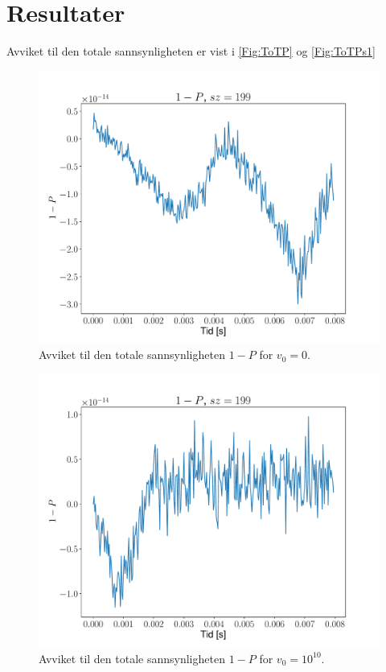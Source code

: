 \documentclass[reprint,english,notitlepage]{revtex4-2}  %
\begin{document}
\section{Resultater}
Avviket til den totale sannsynligheten er vist i \autoref{Fig:ToTP} og \autoref{Fig:ToTPs1}

\begin{figure}[H]
	\centering
	\includegraphics[scale=0.4, trim={0cm 0 0 0}]{../Images/7P199.pdf}
	\caption{Avviket til den totale sannsynligheten $1 - P$ for $v_0 = 0 $.}
	\label{Fig:ToTP}
\end{figure}

\begin{figure}[H]
	\centering
	\includegraphics[scale=0.4, trim={0 0 0 0}]{../Images/7s1P199.pdf}
	\caption{Avviket til den totale sannsynligheten $1 - P$ for $v_0 = 10^10$.}
	\label{Fig:ToTPs1}
\end{figure}
\end{document}
